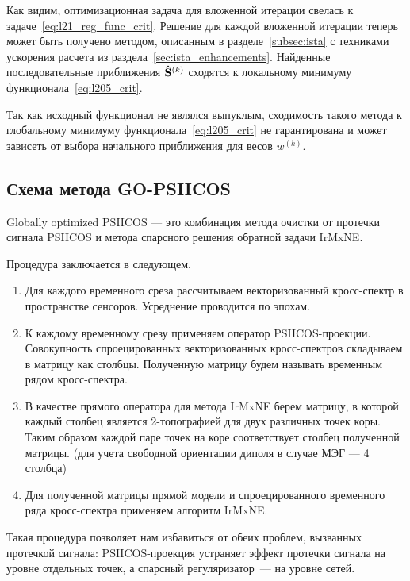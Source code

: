 Как видим, оптимизационная задача для вложенной итерации свелась к
задаче~\ref{eq:l21_reg_func_crit}.  Решение для каждой вложенной итерации теперь может
быть получено методом, описанным в разделе~\ref{subsec:ista} с техниками
ускорения расчета из раздела~\ref{sec:ista_enhancements}.  Найденные
последовательные приближения $\mathbf{\hat{S}}^{(k)}$ сходятся к локальному
минимуму функционала~\ref{eq:l205_crit}.

Так как исходный функционал не являлся выпуклым, сходимость такого метода к глобальному минимуму
функционала~\ref{eq:l205_crit} не гарантирована и может зависеть от выбора начального приближения
для весов $w^{(k)}$.

\subsection{Схема метода GO-PSIICOS}
Globally optimized PSIICOS --- это комбинация метода очистки от
протечки сигнала PSIICOS и метода спарсного решения обратной задачи
IrMxNE.\@

Процедура заключается в следующем.

\begin{enumerate}
    \item Для каждого временного среза рассчитываем векторизованный кросс-спектр 
        в пространстве сенсоров. Усреднение проводится по эпохам.
    \item К каждому временному срезу применяем оператор PSIICOS-проекции. Совокупность 
        спроецированных векторизованных кросс-спектров складываем в матрицу как столбцы. 
        Полученную матрицу будем называть временным рядом кросс-спектра.
    \item В качестве прямого оператора для метода IrMxNE берем матрицу, в которой
        каждый столбец является 2-топографией для двух различных точек коры. Таким
        образом каждой паре точек на коре соответствует столбец полученной матрицы. 
        (для учета свободной ориентации диполя в случае МЭГ --- 4 столбца)
    \item Для полученной матрицы прямой модели и спроецированного
        временного ряда кросс-спектра применяем алгоритм IrMxNE.\@
\end{enumerate}

Такая процедура позволяет нам избавиться от обеих проблем, вызванных протечкой
сигнала: PSIICOS-проекция устраняет эффект протечки сигнала на уровне отдельных
точек, а спарсный регуляризатор~--- на уровне сетей.
